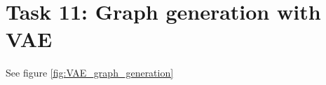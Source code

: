 \documentclass[a4paper]{article}
\begin{document}







% 
% 

\section*{Task 11: Graph generation with VAE}
See figure \ref{fig:VAE_graph_generation}
\end{document}
